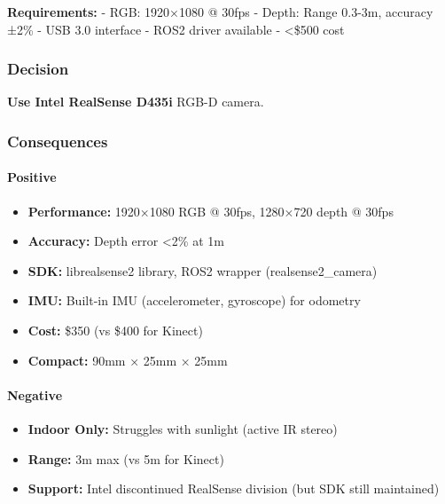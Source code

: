 \documentclass[
]{article}
\providecommand{\tightlist}{%
  \setlength{\itemsep}{0pt}\setlength{\parskip}{0pt}}
\begin{document}
\textbf{Requirements:} - RGB: 1920×1080 @ 30fps - Depth: Range 0.3-3m,
accuracy ±2\% - USB 3.0 interface - ROS2 driver available -
\textless\$500 cost

\hypertarget{decision-12}{%
\subsubsection{Decision}\label{decision-12}}

\textbf{Use Intel RealSense D435i} RGB-D camera.

\hypertarget{consequences-12}{%
\subsubsection{Consequences}\label{consequences-12}}

\hypertarget{positive-12}{%
\paragraph{Positive}\label{positive-12}}

\begin{itemize}
\tightlist
\item
  \textbf{Performance:} 1920×1080 RGB @ 30fps, 1280×720 depth @ 30fps
\item
  \textbf{Accuracy:} Depth error \textless2\% at 1m
\item
  \textbf{SDK:} librealsense2 library, ROS2 wrapper (realsense2\_camera)
\item
  \textbf{IMU:} Built-in IMU (accelerometer, gyroscope) for odometry
\item
  \textbf{Cost:} \$350 (vs \$400 for Kinect)
\item
  \textbf{Compact:} 90mm × 25mm × 25mm
\end{itemize}

\hypertarget{negative-12}{%
\paragraph{Negative}\label{negative-12}}

\begin{itemize}
\tightlist
\item
  \textbf{Indoor Only:} Struggles with sunlight (active IR stereo)
\item
  \textbf{Range:} 3m max (vs 5m for Kinect)
\item
  \textbf{Support:} Intel discontinued RealSense division (but SDK still
  maintained)
\end{itemize}
\end{document}

